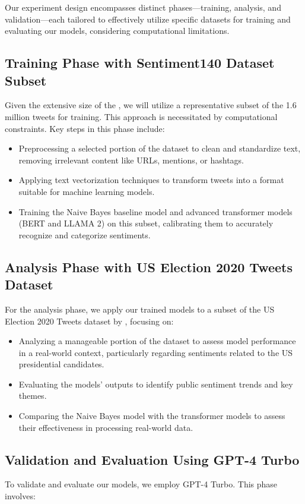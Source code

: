 \documentclass[10pt]{article}
\begin{document}
\begin{multicols}{2}
Our experiment design encompasses distinct phases—training, analysis, and validation—each tailored to effectively utilize specific datasets for training and evaluating our models, considering computational limitations.

\subsection{Training Phase with Sentiment140 Dataset Subset}
Given the extensive size of the \cite{sentiment140}, we will utilize a representative subset of the 1.6 million tweets for training. This approach is necessitated by computational constraints. Key steps in this phase include:

\begin{itemize}
\item Preprocessing a selected portion of the dataset to clean and standardize text, removing irrelevant content like URLs, mentions, or hashtags.
\item Applying text vectorization techniques to transform tweets into a format suitable for machine learning models.
\item Training the Naive Bayes baseline model and advanced transformer models (BERT and LLAMA 2) on this subset, calibrating them to accurately recognize and categorize sentiments.
\end{itemize}

\subsection{Analysis Phase with US Election 2020 Tweets Dataset}
For the analysis phase, we apply our trained models to a subset of the US Election 2020 Tweets dataset by \cite{uselection2020tweets}, focusing on:

\begin{itemize}
\item Analyzing a manageable portion of the dataset to assess model performance in a real-world context, particularly regarding sentiments related to the US presidential candidates.
\item Evaluating the models' outputs to identify public sentiment trends and key themes.
\item Comparing the Naive Bayes model with the transformer models to assess their effectiveness in processing real-world data.
\end{itemize}

\subsection{Validation and Evaluation Using GPT-4 Turbo}
To validate and evaluate our models, we employ GPT-4 Turbo. This phase involves:


\end{multicols}
\end{document}
